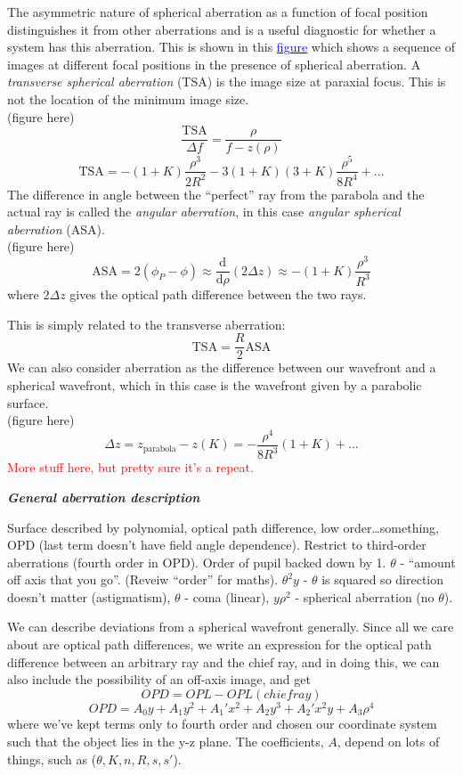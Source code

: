 \documentclass[12pt]{article}
\begin{document}
The asymmetric nature of spherical aberration as a function of focal
position distinguishes it from other aberrations and is a useful
diagnostic for whether a system has this aberration. This is shown in this
\href{http://astronomy.nmsu.edu/holtz/a535/html/diagrams/a535/z11.htm}
{\textcolor{blue}{figure}} which shows a sequence of images at different focal
positions in the presence of spherical aberration.
A \emph{transverse spherical aberration} (TSA) is the image size at paraxial
focus. This is not the location of the minimum image size.\\
(figure here){$$
    \frac{\textrm{TSA}}{\Delta{f}} = \frac{\rho}{f-z(\rho)} $$ $$
    \textrm{TSA} = -(1+K)\frac{\rho^{3}}{2R^{2}} -
    3(1+K)(3+K)\frac{\rho^{5}}{8R^{4}} + \ldots
$$}The difference in angle between the ``perfect'' ray from the parabola
and the actual ray is called the \emph{angular aberration}, in this case
\emph{angular spherical aberration} (ASA).\\
(figure here){$$
    \textrm{ASA} = 2(\phi_{P}-\phi) \approx
    \frac{\textrm{d}}{\textrm{d}\rho}(2\Delta{z}) \approx
    -(1+K)\frac{\rho^{3}}{R^{3}}
$$}where $2\Delta{z}$ gives the optical path difference between the two rays.

This is simply related to the transverse aberration:{$$
    \textrm{TSA} = \frac{R}{2}\textrm{ASA}
$$}We can also consider aberration as the difference between our
wavefront and a spherical wavefront, which in this case is the
wavefront given by a parabolic surface.\\
(figure here){$$
    \Delta{z} = z_{\textrm{parabola}}-z\left(K\right) =
    -\frac{\rho^{4}}{8R^{3}}\left(1+K\right) + \ldots
$$}
\textcolor{red}{More stuff here, but pretty sure it's a repeat.}

\textbf{\emph{General aberration description}}
\par\textcolor{myBlue}{%
    Surface described by polynomial, optical path difference, low
    order\ldots something, OPD (last term doesn't have field angle
    dependence). Restrict to third-order aberrations (fourth order
    in OPD). Order of pupil backed down by 1. $\theta$ - ``amount off
    axis that you go''. (Reveiw ``order'' for maths). $\theta^{2}y$ -
    $\theta$ is squared so direction doesn't matter (astigmatism),
    $\theta$ - coma (linear), $y\rho^{2}$ - spherical aberration
    (no $\theta$).
}
\par We can describe deviations from a spherical wavefront generally. Since
all we care about are optical path differences, we write an expression
for the optical path difference between an arbitrary ray and the chief
ray, and in doing this, we can also include the possibility of an
off-axis image, and get{$$
    OPD = OPL - OPL(chiefray) $$ $$
    OPD = A_0y + A_1y^2 + A_1'x^2 + A_2y^3 + A_2'x^2y + A_3\rho^4
$$}where we've kept terms only to fourth order and chosen our coordinate
system such that the object lies in the y-z plane. The coefficients,
$A$, depend on lots of things, such as ($\theta, K, n, R, s, s'$).
\end{document}

